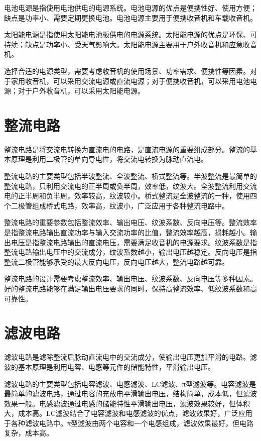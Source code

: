 \documentclass[12pt,UTF8]{ctexbook}
\begin{document}
电池电源是指使用电池供电的电源系统。电池电源的优点是便携性好、使用方便；缺点是功率小、需要定期更换电池。电池电源主要用于便携收音机和车载收音机。

太阳能电源是指使用太阳能电池板供电的电源系统。太阳能电源的优点是环保、可持续；缺点是功率小、受天气影响大。太阳能电源主要用于户外收音机和应急收音机。

选择合适的电源类型，需要考虑收音机的使用场景、功率需求、便携性等因素。对于家用收音机，可以采用交流电源或直流电源；对于便携收音机，可以采用电池电源；对于户外收音机，可以采用太阳能电源。

\section{整流电路}

整流电路是将交流电转换为直流电的电路，是直流电源的重要组成部分。整流的基本原理是利用二极管的单向导电性，将交流电转换为脉动直流电。

整流电路的主要类型包括半波整流、全波整流、桥式整流等。半波整流是最简单的整流电路，只利用交流电的正半周或负半周，效率低，纹波大。全波整流利用交流电的正半周和负半周，效率较高，纹波较小。桥式整流是全波整流的一种，使用四个二极管组成桥式电路，效率高，纹波小，广泛应用于各种整流电路中。

整流电路的重要参数包括整流效率、输出电压、纹波系数、反向电压等。整流效率是指整流电路输出直流功率与输入交流功率的比值，整流效率越高，损耗越小。输出电压是指整流电路输出的直流电压，需要满足收音机的电源要求。纹波系数是指整流电路输出电压中的交流成分，纹波系数越小，输出电压越稳定。反向电压是指整流二极管能够承受的最大反向电压，反向电压越大，整流电路越可靠。

整流电路的设计需要考虑整流效率、输出电压、纹波系数、反向电压等多种因素。好的整流电路能够在满足输出电压要求的同时，保持高整流效率、低纹波系数和高可靠性。

\section{滤波电路}

滤波电路是滤除整流后脉动直流电中的交流成分，使输出电压更加平滑的电路。滤波的基本原理是利用电容、电感等元件的储能特性，平滑输出电压。

滤波电路的主要类型包括电容滤波、电感滤波、LC滤波、π型滤波等。电容滤波是最简单的滤波电路，通过电容的充放电平滑输出电压，结构简单，成本低，但滤波效果一般。电感滤波通过电感的储能特性平滑输出电压，滤波效果较好，但体积大，成本高。LC滤波结合了电容滤波和电感滤波的优点，滤波效果好，广泛应用于各种滤波电路中。π型滤波由两个电容和一个电感组成，滤波效果最好，但电路复杂，成本高。
\end{document}
